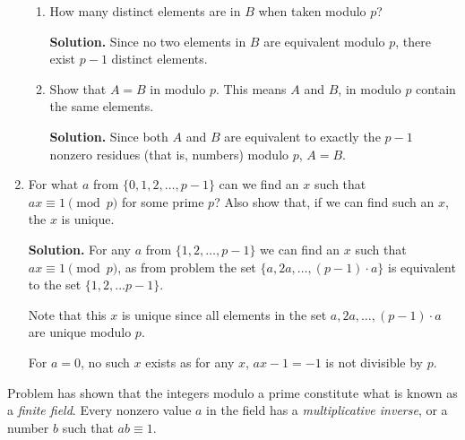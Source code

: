 \documentclass[11pt]{article}
\theoremstyle{definition}
\begin{document}
\begin{enumerate}
\begin{enumerate}
\item How many distinct elements are in $B$ when taken modulo $p$?

\textbf{Solution.}
Since no two elements in $B$ are equivalent modulo $p$, there exist $p - 1$ distinct elements.

\item Show that $A = B$ in modulo $p$. This means $A$ and $B$, in modulo $p$ contain the same elements.

\textbf{Solution.}
Since both $A$ and $B$ are equivalent to exactly the $p - 1$ nonzero residues (that is, numbers) modulo $p$, $A=B$.

\end{enumerate}


\item \addtocounter{problem_count}{1}
For what $a$ from $\{0, 1, 2, \ldots, p - 1\}$ can we find an $x$ such that $ax \equiv 1 \pmod{p}$ for some prime $p$? Also show that, if we can find such an $x$, the $x$ is unique.

\textbf{Solution.}
For any $a$ from $\{1, 2, \ldots, p - 1 \}$ we can find an $x$ such that $ax \equiv 1 \pmod{p}$, as from problem  the set $\{a, 2a, \ldots, (p - 1) \cdot a\}$ is equivalent to the set $\{1, 2, \ldots p - 1\}$.

Note that this $x$ is unique since all elements in the set $a, 2a, \ldots, (p - 1) \cdot a$ are unique modulo $p$.

For $a = 0$, no such $x$ exists as for any $x$, $ax - 1 = -1$ is not divisible by $p$.

\end{enumerate}


Problem  has shown that the integers
modulo a prime constitute what is known as a \textit{finite field}. Every nonzero value $a$ in the field has a \textit{multiplicative inverse}, or a number $b$ such that $ab \equiv 1$.
\end{document}
